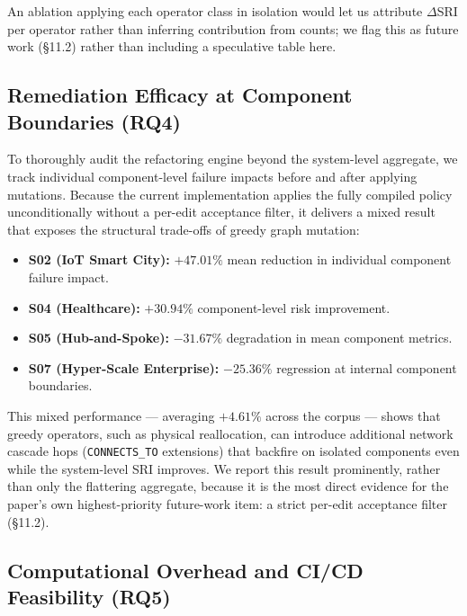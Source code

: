 \documentclass[11pt]{article}
\begin{document}
An ablation applying each operator class in isolation would let us attribute $\Delta$SRI per operator
rather than inferring contribution from counts; we flag this as future work (\S11.2) rather than
including a speculative table here.

\subsection{Remediation Efficacy at Component Boundaries (RQ4)}

To thoroughly audit the refactoring engine beyond the system-level aggregate, we track individual
component-level failure impacts before and after applying mutations. Because the current
implementation applies the fully compiled policy unconditionally without a per-edit acceptance filter,
it delivers a mixed result that exposes the structural trade-offs of greedy graph mutation:

\begin{itemize}
\item \textbf{S02 (IoT Smart City):} $+47.01\%$ mean reduction in individual component failure impact.
\item \textbf{S04 (Healthcare):} $+30.94\%$ component-level risk improvement.
\item \textbf{S05 (Hub-and-Spoke):} $-31.67\%$ degradation in mean component metrics.
\item \textbf{S07 (Hyper-Scale Enterprise):} $-25.36\%$ regression at internal component boundaries.
\end{itemize}

This mixed performance --- averaging $\mathbf{+4.61\%}$ across the corpus --- shows that greedy
operators, such as physical reallocation, can introduce additional network cascade hops
(\texttt{CONNECTS\_TO} extensions) that backfire on isolated components even while the system-level
SRI improves. We report this result prominently, rather than only the flattering aggregate, because it
is the most direct evidence for the paper's own highest-priority future-work item: a strict per-edit
acceptance filter (\S11.2).

\subsection{Computational Overhead and CI/CD Feasibility (RQ5)}
\end{document}
